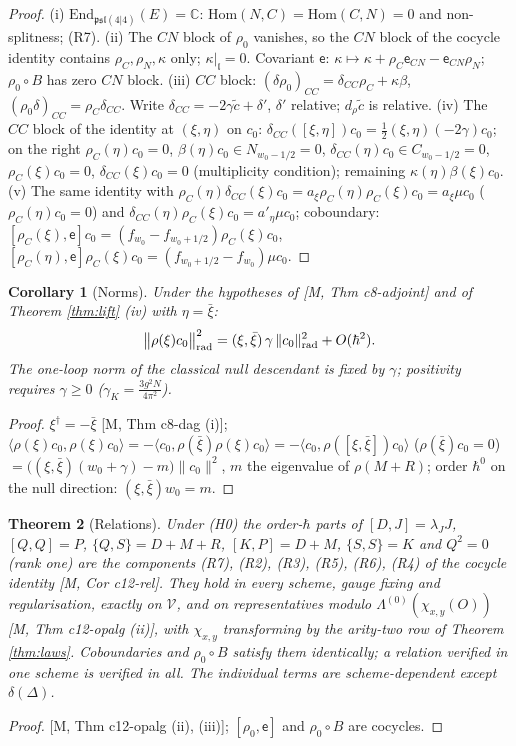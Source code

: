 \documentclass[10pt]{article}
\newtheorem{theorem}{Theorem}[section]
\newtheorem{corollary}[theorem]{Corollary}
\theoremstyle{definition}
\newcommand{\pl}{\mathfrak{psl}(4|4)}
\newcommand{\V}{\mathcal V}
\newcommand{\End}{\mathrm{End}}
\newcommand{\Hom}{\mathrm{Hom}}
\newcommand{\lf}{\mathfrak l}
\newcommand{\ee}{\mathsf e}
\begin{document}
\begin{proof}
(i) $\End_{\pl}(E)=\mathbb C$: $\Hom(N,C)=\Hom(C,N)=0$ and non-splitness; (R7). (ii) The $CN$ block of $\rho_0$ vanishes, so the $CN$ block of the cocycle identity contains $\rho_C,\rho_N,\kappa$ only; $\kappa|_{\lf}=0$. Covariant $\ee$: $\kappa\mapsto\kappa+\rho_C\ee_{CN}-\ee_{CN}\rho_N$; $\rho_0\circ B$ has zero $CN$ block. (iii) $CC$ block: $(\delta\rho_0)_{CC}=\delta_{CC}\rho_C+\kappa\beta$, $(\rho_0\delta)_{CC}=\rho_C\delta_{CC}$. Write $\delta_{CC}=-2\gamma\tilde c+\delta'$, $\delta'$ relative; $d_\rho\tilde c$ is relative. (iv) The $CC$ block of the identity at $(\xi,\eta)$ on $c_0$: $\delta_{CC}([\xi,\eta])c_0=\tfrac12(\xi,\eta)(-2\gamma)c_0$; on the right $\rho_C(\eta)c_0=0$, $\beta(\eta)c_0\in N_{w_0-1/2}=0$, $\delta_{CC}(\eta)c_0\in C_{w_0-1/2}=0$, $\rho_C(\xi)c_0=0$, $\delta_{CC}(\xi)c_0=0$ (multiplicity condition); remaining $\kappa(\eta)\beta(\xi)c_0$. (v) The same identity with $\rho_C(\eta)\delta_{CC}(\xi)c_0=a_\xi\rho_C(\eta)\rho_C(\xi)c_0=a_\xi\mu c_0$ ($\rho_C(\eta)c_0=0$) and $\delta_{CC}(\eta)\rho_C(\xi)c_0=a'_\eta\mu c_0$; coboundary: $[\rho_C(\xi),\ee]c_0=(f_{w_0}-f_{w_0+1/2})\rho_C(\xi)c_0$, $[\rho_C(\eta),\ee]\rho_C(\xi)c_0=(f_{w_0+1/2}-f_{w_0})\mu c_0$.
\end{proof}

\begin{corollary}[Norms]\label{cor:norm}
Under the hypotheses of [M, Thm c8-adjoint] and of Theorem \ref{thm:lift} (iv) with $\eta=\bar\xi$:
\[
\big\|\rho(\xi)c_0\big\|^2_{\rm rad}=(\xi,\bar\xi)\,\gamma\,\|c_0\|^2_{\rm rad}+O(\hbar^2).
\]
The one-loop norm of the classical null descendant is fixed by $\gamma$; positivity requires $\gamma\ge0$ ($\gamma_K=\tfrac{3g^2N}{4\pi^2}$).
\end{corollary}
\begin{proof}
$\xi^\dagger=-\bar\xi$ [M, Thm c8-dag (i)]; $\langle\rho(\xi)c_0,\rho(\xi)c_0\rangle=-\langle c_0,\rho(\bar\xi)\rho(\xi)c_0\rangle=-\langle c_0,\rho([\xi,\bar\xi])c_0\rangle$ ($\rho(\bar\xi)c_0=0$) $=\big((\xi,\bar\xi)(w_0+\gamma)-m\big)\|c_0\|^2$, $m$ the eigenvalue of $\rho(M+R)$; order $\hbar^0$ on the null direction: $(\xi,\bar\xi)w_0=m$.
\end{proof}

\begin{theorem}[Relations]\label{thm:rel}
Under (H0) the order-$\hbar$ parts of $[D,J]=\lambda_JJ$, $[Q,Q]=P$, $\{Q,S\}=D+M+R$, $[K,P]=D+M$, $\{S,S\}=K$ and $Q^2=0$ (rank one) are the components (R7), (R2), (R3), (R5), (R6), (R4) of the cocycle identity [M, Cor c12-rel]. They hold in every scheme, gauge fixing and regularisation, exactly on $\V$, and on representatives modulo $\Lambda^{(0)}(\chi_{x,y}(O))$ [M, Thm c12-opalg (ii)], with $\chi_{x,y}$ transforming by the arity-two row of Theorem \ref{thm:laws}. Coboundaries and $\rho_0\circ B$ satisfy them identically; a relation verified in one scheme is verified in all. The individual terms are scheme-dependent except $\delta(\Delta)$.
\end{theorem}
\begin{proof}{}[M, Thm c12-opalg (ii), (iii)]; $[\rho_0,\ee]$ and $\rho_0\circ B$ are cocycles.
\end{proof}
\end{document}
